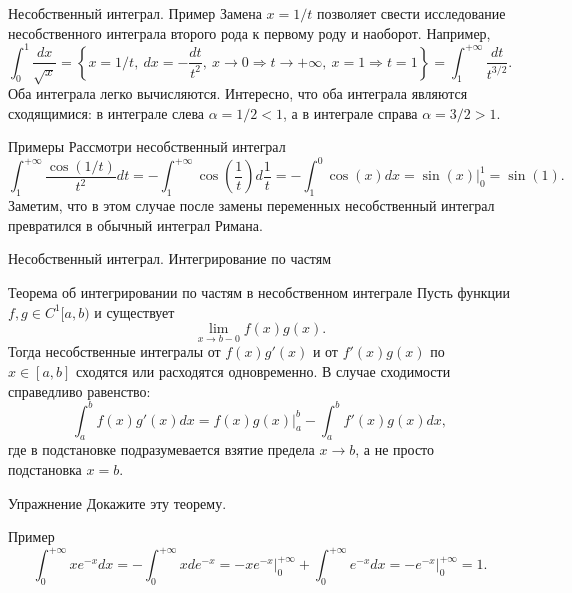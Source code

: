 \documentclass[8pt]{beamer}
\begin{document}
\begin{frame}{Несобственный интеграл. Пример}
Замена $x=1/t$ позволяет свести исследование несобственного интеграла второго рода к первому роду и наоборот. Например,
$$\int_0^1 \frac{dx}{\sqrt{x}} = \left\{ x=1/t, \ dx = -\frac{dt}{t^2},\ x\to0 \Rightarrow t\to+\infty,\ x=1\Rightarrow t=1\right\} = \int_1^{+\infty} \frac{dt}{t^{3/2}}.$$
Оба интеграла легко вычисляются. Интересно, что оба интеграла являются сходящимися: в интеграле слева $\alpha=1/2<1$, а в интеграле справа $\alpha=3/2>1$.
\begin{block}{Примеры}
Рассмотри несобственный интеграл
$$\int_1^{+\infty} \frac{\cos(1/t)}{t^2}dt = -\int_1^{+\infty} \cos\left(\frac{1}{t}\right) d\frac{1}{t} = -\int_1^0\cos(x)dx = \sin(x)\Big|_0^1 = \sin(1).$$
Заметим, что в этом случае после замены переменных несобственный интеграл превратился в обычный интеграл Римана.
\end{block}
\end{frame}

\begin{frame}{Несобственный интеграл. Интегрирование по частям}
\begin{block}{Теорема об интегрировании по частям в несобственном интеграле}
Пусть функции $f,g\in C^1[a,b)$ и существует
$$\lim_{x\to b-0} f(x)g(x).$$
Тогда несобственные интегралы от $f(x)g'(x)$ и от $f'(x)g(x)$ по $x\in[a,b]$ сходятся или расходятся одновременно. В случае сходимости справедливо равенство:
$$\int_a^b f(x)g'(x)dx = f(x)g(x)\Big|_a^b - \int_a^b f'(x)g(x)dx,$$
где в подстановке подразумевается взятие предела $x\to b$, а не просто подстановка $x=b$.
\end{block}
\begin{block}{Упражнение}
Докажите эту теорему.
\end{block}
\begin{block}{Пример}
$$\int_0^{+\infty}xe^{-x}dx = -\int_0^{+\infty}xde^{-x} =- x e^{-x}\Big|_0^{+\infty} + \int_0^{+\infty}e^{-x}dx = -e^{-x}\Big|_0^{+\infty} = 1.$$
\end{block}
\end{frame}

\end{document}
